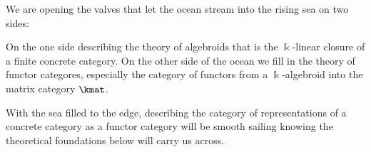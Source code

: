 We are opening the valves that let the ocean stream into the rising sea on two sides:

On the one side describing the theory of algebroids that is the $\Bbbk$-linear closure of a finite concrete category.
On the other side of the ocean we fill in the theory of functor categores, especially the category of functors from
a $\Bbbk$-algebroid into the matrix category $\kmat$.

With the sea filled to the edge, describing the category of representations of a concrete category as a functor category
will be smooth sailing knowing the theoretical foundations below will carry us across.
